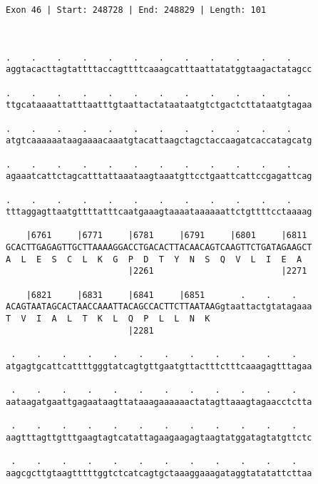 \documentclass{article}
\begin{document}
\begin{Verbatim}
Exon 46 | Start: 248728 | End: 248829 | Length: 101



.    .    .    .    .    .    .    .    .    .    .    .    
aggtacacttagtattttaccagttttcaaagcatttaattatatggtaagactatagcc
                                                            
.    .    .    .    .    .    .    .    .    .    .    .    
ttgcataaaattatttaatttgtaattactataataatgtctgactcttataatgtagaa
                                                            
.    .    .    .    .    .    .    .    .    .    .    .    
atgtcaaaaaataagaaaacaaatgtacattaagctagctaccaagatcaccatagcatg
                                                            
.    .    .    .    .    .    .    .    .    .    .    .    
agaaatcattctagcatttattaaataagtaaatgttcctgaattcattccgagattcag
                                                            
.    .    .    .    .    .    .    .    .    .    .    .    
tttaggagttaatgttttatttcaatgaaagtaaaataaaaaattctgttttcctaaaag
                                                            
    |6761     |6771     |6781     |6791     |6801     |6811 
GCACTTGAGAGTTGCTTAAAAGGACCTGACACTTACAACAGTCAAGTTCTGATAGAAGCT
A  L  E  S  C  L  K  G  P  D  T  Y  N  S  Q  V  L  I  E  A  
                        |2261                         |2271 
  
    |6821     |6831     |6841     |6851       .    .    .   
ACAGTAATAGCACTAACCAAATTACAGCCACTTCTTAATAAGgtaattactgtatagaaa
T  V  I  A  L  T  K  L  Q  P  L  L  N  K                    
                        |2281                               
  
 .    .    .    .    .    .    .    .    .    .    .    .   
atgagtgcattcattttgggtatcagtgttgaatgttactttctttcaaagagtttagaa
                                                            
 .    .    .    .    .    .    .    .    .    .    .    .   
aataagatgaattgagaataagttataaagaaaaaactatagttaaagtagaacctctta
                                                            
 .    .    .    .    .    .    .    .    .    .    .    .   
aagtttagttgtttgaagtagtcatattagaagaagagtaagtatggatagtatgttctc
                                                            
 .    .    .    .    .    .    .    .    .    .    .    .   
aagcgcttgtaagtttttggtctcatcagtgctaaaggaaagataggtatatattcttaa
                                                            

\end{Verbatim}
\end{document}
